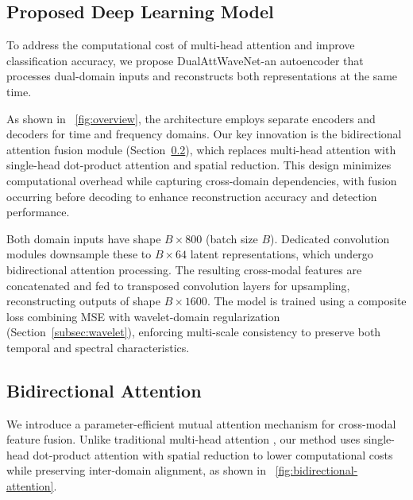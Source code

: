\documentclass[conference]{IEEEtran}
\begin{document}

\subsection{Proposed Deep Learning Model}
\label{subsec:proposed_model}

To address the computational cost of multi-head attention and improve classification accuracy, we propose DualAttWaveNet-an autoencoder that processes dual-domain inputs and reconstructs both representations at the same time.

As shown in \figurename~\ref{fig:overview}, the architecture employs separate encoders and decoders for time and frequency domains. Our key innovation is the bidirectional attention fusion module (Section~\ref{subsec:bi_attn}), which replaces multi-head attention with single-head dot-product attention and spatial reduction. This design minimizes computational overhead while capturing cross-domain dependencies, with fusion occurring before decoding to enhance reconstruction accuracy and detection performance.

Both domain inputs have shape $B \times 800$ (batch size $B$). Dedicated convolution modules downsample these to $B \times 64$ latent representations, which undergo bidirectional attention processing. The resulting cross-modal features are concatenated and fed to transposed convolution layers for upsampling, reconstructing outputs of shape $B \times 1600$. The model is trained using a composite loss combining MSE with wavelet-domain regularization (Section~\ref{subsec:wavelet}), enforcing multi-scale consistency to preserve both temporal and spectral characteristics.

\subsection{Bidirectional Attention}
\label{subsec:bi_attn}

We introduce a parameter-efficient mutual attention mechanism for cross-modal feature fusion. Unlike traditional multi-head attention \cite{vaswaniAttentionAllYou2017}, our method uses single-head dot-product attention with spatial reduction to lower computational costs while preserving inter-domain alignment, as shown in \figurename~\ref{fig:bidirectional-attention}.
\end{document}
